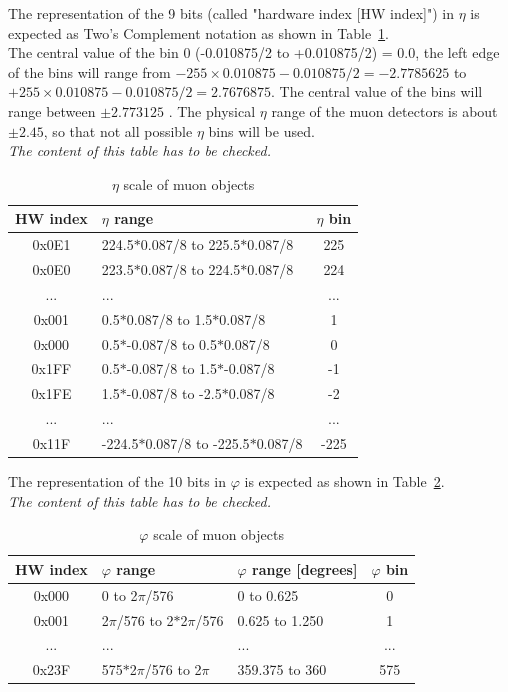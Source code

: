 The representation of the 9 bits (called "hardware index [HW index]") in $\eta$ is expected as Two's Complement notation as shown in Table~\ref{tab:gtl:muon_eta_scale}.\\
The central value of the bin 0 (-0.010875/2 to +0.010875/2) = 0.0, the left edge of the bins will range from $-255 \times 0.010875 - 0.010875/2 = -2.7785625$ to $+255 \times 0.010875 - 0.010875/2 = 2.7676875$.
The central value of the bins will range between $\pm 2.773125$ . The physical $\eta$ range of the muon detectors is about $\pm2.45$, so that not all possible $\eta$ bins will be used.\\ 
\textit{The content of this table has to be checked.}
 
\begin{table}[htdp]
\begin{center}
\begin{tabular}{|c|l|c|}\hline
HW index & $\eta$ range & $\eta$ bin\\\hline\hline
0x0E1 & 224.5$*$0.087/8 to 225.5$*$0.087/8 & 225\\\hline
0x0E0 & 223.5$*$0.087/8 to 224.5$*$0.087/8 & 224\\\hline
... & ... & ...\\\hline
0x001 & 0.5$*$0.087/8 to 1.5$*$0.087/8 & 1\\\hline
0x000 & 0.5$*$-0.087/8 to 0.5$*$0.087/8 & 0\\\hline
0x1FF & 0.5$*$-0.087/8 to 1.5$*$-0.087/8 & -1\\\hline
0x1FE & 1.5$*$-0.087/8 to -2.5$*$0.087/8 & -2\\\hline
... & ... & ...\\\hline
0x11F & -224.5$*$0.087/8 to -225.5$*$0.087/8 & -225\\\hline
\end{tabular}
\end{center}
\caption{$\eta$ scale of muon objects}
\label{tab:gtl:muon_eta_scale}
\end{table}

The representation of the 10 bits in $\varphi$ is expected as shown in Table~\ref{tab:gtl:muon_phi_scale}.\\
\textit{The content of this table has to be checked.}
 
\begin{table}[htdp]
\begin{center}
\begin{tabular}{|c|l|l|c|}\hline
HW index & $\varphi$ range & $\varphi$ range [degrees] & $\varphi$ bin\\\hline\hline
0x000 & 0 to 2$\pi$/576 & 0 to 0.625 & 0\\\hline
0x001 & 2$\pi$/576 to 2$*$2$\pi$/576 & 0.625 to 1.250 & 1\\\hline
... & ... & ... & ...\\\hline
0x23F & 575$*$2$\pi$/576 to 2$\pi$ & 359.375 to 360 & 575\\\hline
\end{tabular}
\end{center}
\caption{$\varphi$ scale of muon objects}
\label{tab:gtl:muon_phi_scale}
\end{table}

